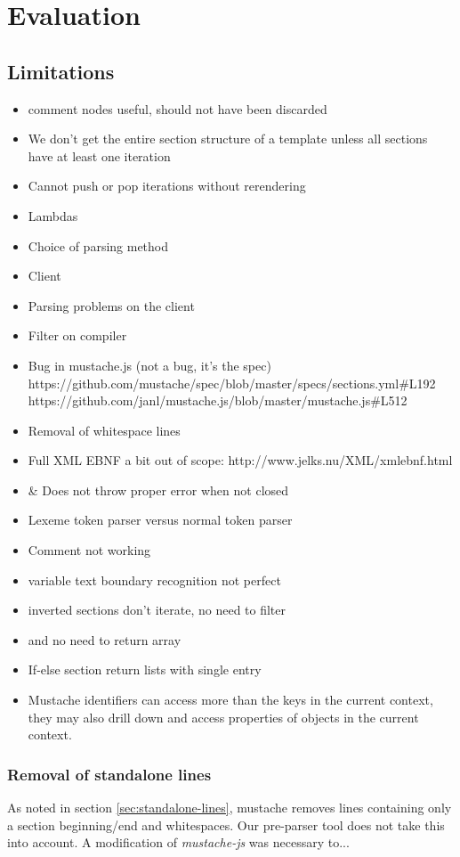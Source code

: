\documentclass[thesis.tex]{subfiles}
\begin{document}
\chapter{Evaluation}
\label{chap:eval}
\section{Limitations}
\begin{itemize}
\item comment nodes useful, should not have been discarded
\item We don't get the entire section structure of a template unless all
      sections have at least one iteration
\item Cannot push or pop iterations without rerendering
\item Lambdas
\item Choice of parsing method
\item Client
\item Parsing problems on the client
\item Filter on compiler
\item Bug in mustache.js (not a bug, it's the spec)
      https://github.com/mustache/spec/blob/master/specs/sections.yml\#L192
      https://github.com/janl/mustache.js/blob/master/mustache.js\#L512
\item Removal of whitespace lines
\item Full XML EBNF a bit out of scope: http://www.jelks.nu/XML/xmlebnf.html
\item \& Does not throw proper error when not closed
\item Lexeme token parser versus normal token parser
\item Comment not working
\item variable text boundary recognition not perfect
\item inverted sections don't iterate, no need to filter
\item and no need to return array
\item If-else section return lists with single entry
\item Mustache identifiers can access more than the keys in the current context,
      they may also drill down and access properties of objects in the current
      context.
\end{itemize}

\subsection{Removal of standalone lines}
As noted in section \ref{sec:standalone-lines}, mustache removes lines
containing only a section beginning/end and whitespaces.
Our pre-parser tool does not take this into account. A modification of
\emph{mustache-js} was necessary to...
\end{document}
